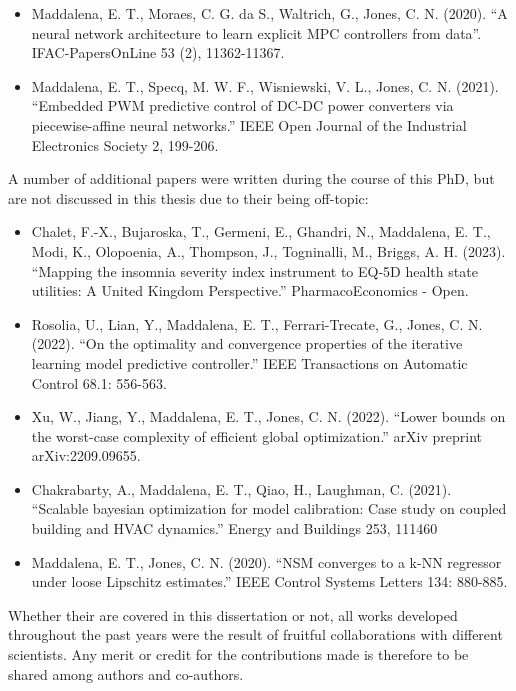 \begin{itemize}
	\item Maddalena, E. T., Moraes, C. G. da S., Waltrich, G., Jones, C. N. (2020). ``A neural network architecture to learn explicit MPC controllers from data''. IFAC-PapersOnLine 53 (2), 11362-11367. 
	
	\item Maddalena, E. T., Specq, M. W. F., Wisniewski, V. L., Jones, C. N. (2021). ``Embedded PWM predictive control of DC-DC power converters via piecewise-affine neural networks.'' IEEE Open Journal of the Industrial Electronics Society 2, 199-206.
\end{itemize}


A number of additional papers were written during the course of this PhD, but are not discussed in this thesis due to their being off-topic:

\begin{itemize}	
	\item Chalet, F.-X., Bujaroska,  T., Germeni, E., Ghandri, N., Maddalena, E. T., Modi, K., Olopoenia, A., Thompson, J., Togninalli, M., Briggs, A. H. (2023). ``Mapping the insomnia severity index instrument to EQ‑5D health state utilities: A United Kingdom Perspective.'' PharmacoEconomics - Open.
	
	\item Rosolia, U., Lian, Y., Maddalena, E. T., Ferrari-Trecate, G., Jones, C. N. (2022). ``On the optimality and convergence properties of the iterative learning model predictive controller.'' IEEE Transactions on Automatic Control 68.1: 556-563.	
	
	\item Xu, W., Jiang, Y., Maddalena, E. T., Jones, C. N. (2022). ``Lower bounds on the worst-case complexity of efficient global optimization.'' arXiv preprint arXiv:2209.09655.
		
	\item Chakrabarty, A., Maddalena, E. T., Qiao, H., Laughman, C. (2021). ``Scalable bayesian optimization for model calibration: Case study on coupled building and HVAC dynamics.'' Energy and Buildings 253, 111460
	
	\item Maddalena, E. T., Jones, C. N. (2020). ``NSM converges to a k-NN regressor under loose Lipschitz estimates.'' IEEE Control Systems Letters  134: 880-885.
\end{itemize}

Whether their are covered in this dissertation or not, all works developed throughout the past years were the result of fruitful collaborations with different scientists. Any merit or credit for the contributions made is therefore to be shared among authors and co-authors.